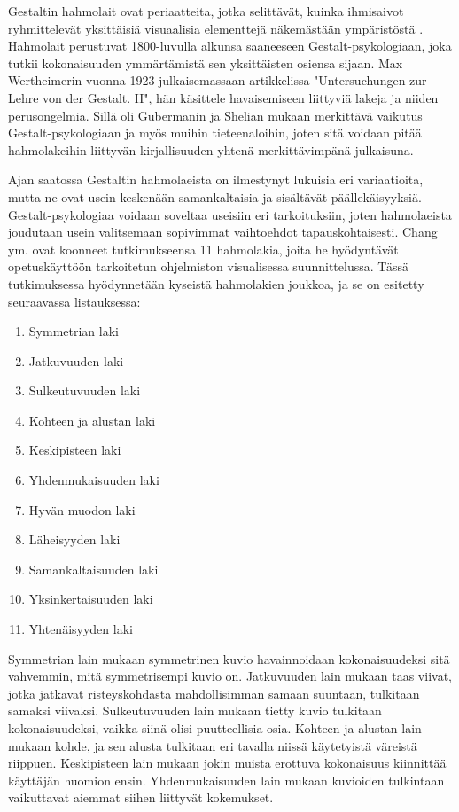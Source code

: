 \documentclass[utf8]{gradu3}
\begin{document}
Gestaltin hahmolait ovat periaatteita, jotka selittävät, kuinka ihmisaivot ryhmittelevät yksittäisiä visuaalisia elementtejä näkemästään ympäristöstä \parencite{koffka}. Hahmolait perustuvat 1800-luvulla alkunsa saaneeseen Gestalt-psykologiaan, joka tutkii kokonaisuuden ymmärtämistä sen yksittäisten osiensa sijaan. Max Wertheimerin vuonna 1923 julkaisemassaan artikkelissa "Untersuchungen zur Lehre von der Gestalt. II", hän käsittele havaisemiseen liittyviä lakeja ja niiden perusongelmia. Sillä oli Gubermanin ja Shelian \parencite*{rearranged} mukaan merkittävä vaikutus Gestalt-psykologiaan ja myös muihin tieteenaloihin, joten sitä voidaan pitää hahmolakeihin liittyvän kirjallisuuden yhtenä merkittävimpänä julkaisuna. 

Ajan saatossa Gestaltin hahmolaeista on ilmestynyt lukuisia eri variaatioita, mutta ne ovat usein keskenään samankaltaisia ja sisältävät päällekäisyyksiä. Gestalt-psykologiaa voidaan soveltaa useisiin eri tarkoituksiin, joten hahmolaeista joudutaan usein valitsemaan sopivimmat vaihtoehdot tapauskohtaisesti. Chang ym. \parencite*{chang} ovat koonneet tutkimukseensa 11 hahmolakia, joita he hyödyntävät opetuskäyttöön tarkoitetun ohjelmiston visualisessa suunnittelussa. Tässä tutkimuksessa hyödynnetään kyseistä hahmolakien joukkoa, ja se on esitetty seuraavassa listauksessa:

\begin{enumerate}
  \item Symmetrian laki
  \item Jatkuvuuden laki
  \item Sulkeutuvuuden laki
  \item Kohteen ja alustan laki
  \item Keskipisteen laki
  \item Yhdenmukaisuuden laki
  \item Hyvän muodon laki
  \item Läheisyyden laki
  \item Samankaltaisuuden laki
  \item Yksinkertaisuuden laki
  \item Yhtenäisyyden laki
\end{enumerate}

Symmetrian lain mukaan symmetrinen kuvio havainnoidaan kokonaisuudeksi sitä vahvemmin, mitä symmetrisempi kuvio on. Jatkuvuuden lain mukaan taas viivat, jotka jatkavat risteyskohdasta mahdollisimman samaan suuntaan, tulkitaan samaksi viivaksi. Sulkeutuvuuden lain mukaan tietty kuvio tulkitaan kokonaisuudeksi, vaikka siinä olisi puutteellisia osia. Kohteen ja alustan lain mukaan kohde, ja sen alusta tulkitaan eri tavalla niissä käytetyistä väreistä riippuen. Keskipisteen lain mukaan jokin muista erottuva kokonaisuus kiinnittää käyttäjän huomion ensin. Yhdenmukaisuuden lain mukaan kuvioiden tulkintaan vaikuttavat aiemmat siihen liittyvät kokemukset. 
\end{document}
